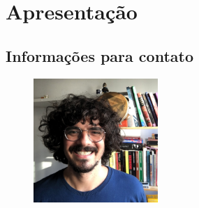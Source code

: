 \chapter{Apresentação}
\renewcommand{\chaptername}{Apresentação}
\label{cap:apresentacao}

\section{Informações para contato}

\setlength{}
\begin{figure} 
	\centering
	\includegraphics[width=0.42\textwidth,angle=-90]{foto.jpg}
\end{figure}

